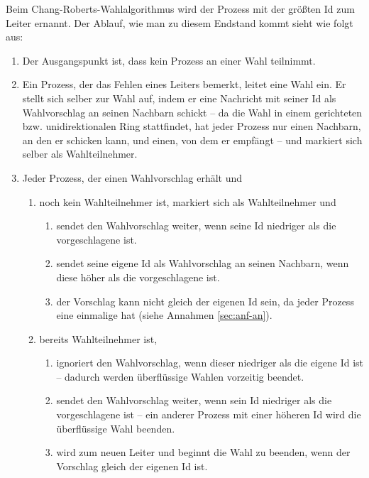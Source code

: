 Beim Chang-Roberts-Wahlalgorithmus wird der Prozess mit der größten Id zum Leiter ernannt. Der Ablauf, wie man zu diesem Endstand kommt sieht wie folgt aus:
\begin{enumerate}
    \item Der Ausgangspunkt ist, dass kein Prozess an einer Wahl teilnimmt.
    \item Ein Prozess, der das Fehlen eines Leiters bemerkt, leitet eine Wahl ein. 
          Er stellt sich selber zur Wahl auf, indem er eine Nachricht mit seiner Id als Wahlvorschlag an seinen Nachbarn schickt -- da die Wahl in einem 
          gerichteten bzw. unidirektionalen Ring stattfindet, hat jeder Prozess nur einen Nachbarn, an den er schicken kann, und einen, von dem er empfängt 
          -- und markiert sich selber als Wahlteilnehmer.
    \item Jeder Prozess, der einen Wahlvorschlag erhält und
          \begin{enumerate}
              \item noch kein Wahlteilnehmer ist, markiert sich als Wahlteilnehmer und
                    \begin{enumerate}
                        \item sendet den Wahlvorschlag weiter, wenn seine Id niedriger als die vorgeschlagene ist.
                        \item sendet seine eigene Id als Wahlvorschlag an seinen Nachbarn, wenn diese höher als die vorgeschlagene ist.
                        \item der Vorschlag kann nicht gleich der eigenen Id sein, da jeder Prozess eine einmalige hat (siehe Annahmen \ref{sec:anf-an}).
                    \end{enumerate}
                \item bereits Wahlteilnehmer ist, 
                    \begin{enumerate}
                        \item ignoriert den Wahlvorschlag, wenn dieser niedriger als die eigene Id ist -- dadurch werden überflüssige Wahlen vorzeitig 
                              beendet.
                        \item sendet den Wahlvorschlag weiter, wenn sein Id niedriger als die vorgeschlagene ist -- ein anderer Prozess mit einer höheren Id
                              wird die überflüssige Wahl beenden.
                        \item wird zum neuen Leiter und beginnt die Wahl zu beenden, wenn der Vorschlag gleich der eigenen Id ist.

\end{enumerate}
\end{enumerate}
\end{enumerate}
